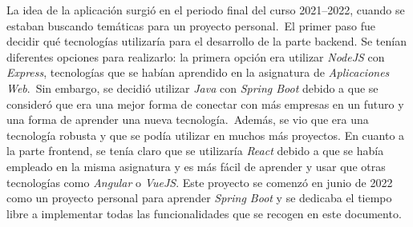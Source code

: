La idea de la aplicación surgió en el periodo final del curso 2021--2022, cuando se estaban buscando temáticas para
un proyecto personal.\ El primer paso fue decidir qué tecnologías utilizaría para el desarrollo de la parte backend.
Se tenían diferentes opciones para realizarlo: la primera opción era utilizar \textit{NodeJS} con \textit{Express},
tecnologías que se habían aprendido en la asignatura de \textit{Aplicaciones Web}.\ Sin embargo, se decidió utilizar
\textit{Java} con \textit{Spring Boot} debido a que se consideró que era una mejor forma de conectar con más
empresas en un futuro y una forma de aprender una nueva tecnología.\ Además, se vio que era una tecnología
robusta y que se podía utilizar en muchos más proyectos.
En cuanto a la parte frontend, se tenía claro que se utilizaría \textit{React} debido a que se había empleado en la
misma asignatura y es más fácil de aprender y usar que otras tecnologías como \textit{Angular} o \textit{VueJS}.
Este proyecto se comenzó en junio de 2022 como un proyecto personal para aprender \textit{Spring Boot} y
se dedicaba el tiempo libre a implementar todas las funcionalidades que se recogen en este documento.
